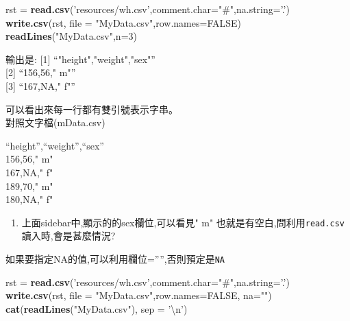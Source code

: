 \documentclass[]{book}
\newenvironment{Shaded}{\begin{snugshade}}{\end{snugshade}}
\newcommand{\CharTok}[1]{\textcolor[rgb]{0.31,0.60,0.02}{#1}}
\newcommand{\DataTypeTok}[1]{\textcolor[rgb]{0.13,0.29,0.53}{#1}}
\newcommand{\DecValTok}[1]{\textcolor[rgb]{0.00,0.00,0.81}{#1}}
\newcommand{\KeywordTok}[1]{\textcolor[rgb]{0.13,0.29,0.53}{\textbf{#1}}}
\newcommand{\NormalTok}[1]{#1}
\newcommand{\OtherTok}[1]{\textcolor[rgb]{0.56,0.35,0.01}{#1}}
\newcommand{\StringTok}[1]{\textcolor[rgb]{0.31,0.60,0.02}{#1}}
\providecommand{\tightlist}{%
  \setlength{\itemsep}{0pt}\setlength{\parskip}{0pt}}
\theoremstyle{definition}
\theoremstyle{definition}
\theoremstyle{definition}
\theoremstyle{remark}
\begin{document}
\begin{Shaded}
\begin{Highlighting}[]
\NormalTok{rst =}\StringTok{ }\KeywordTok{read.csv}\NormalTok{(}\StringTok{'resources/wh.csv'}\NormalTok{,}\DataTypeTok{comment.char=}\StringTok{"#"}\NormalTok{,}\DataTypeTok{na.string=}\StringTok{'.'}\NormalTok{)}
\KeywordTok{write.csv}\NormalTok{(rst, }\DataTypeTok{file =} \StringTok{"MyData.csv"}\NormalTok{,}\DataTypeTok{row.names=}\OtherTok{FALSE}\NormalTok{)}
\KeywordTok{readLines}\NormalTok{(}\StringTok{"MyData.csv"}\NormalTok{,}\DataTypeTok{n=}\DecValTok{3}\NormalTok{) }
\end{Highlighting}
\end{Shaded}

輸出是: {[}1{]} ``"height","weight","sex"''\\
{[}2{]} ``156,56," m"''\\
{[}3{]} ``167,NA," f"''

可以看出來每一行都有雙引號表示字串。\\
對照文字檔(mData.csv)

``height'',``weight'',``sex''\\
156,56," m"\\
167,NA," f"\\
189,70," m"\\
180,NA," f"

\begin{enumerate}
\def\labelenumi{\arabic{enumi}.}
\tightlist
\item
  上面sidebar中,顯示的的sex欄位,可以看見" m"
  也就是有空白,問利用\texttt{read.csv} 讀入時,會是甚麼情況?
\end{enumerate}

如果要指定NA的值,可以利用欄位='''',否則預定是\texttt{NA}

\begin{Shaded}
\begin{Highlighting}[]
\NormalTok{rst =}\StringTok{ }\KeywordTok{read.csv}\NormalTok{(}\StringTok{'resources/wh.csv'}\NormalTok{,}\DataTypeTok{comment.char=}\StringTok{"#"}\NormalTok{,}\DataTypeTok{na.string=}\StringTok{'.'}\NormalTok{)}
\KeywordTok{write.csv}\NormalTok{(rst, }\DataTypeTok{file =} \StringTok{"MyData.csv"}\NormalTok{,}\DataTypeTok{row.names=}\OtherTok{FALSE}\NormalTok{, }\DataTypeTok{na=}\StringTok{""}\NormalTok{)}
\KeywordTok{cat}\NormalTok{(}\KeywordTok{readLines}\NormalTok{(}\StringTok{"MyData.csv"}\NormalTok{), }\DataTypeTok{sep =} \StringTok{'}\CharTok{\textbackslash{}n}\StringTok{'}\NormalTok{)}
\end{Highlighting}
\end{Shaded}
\end{document}
